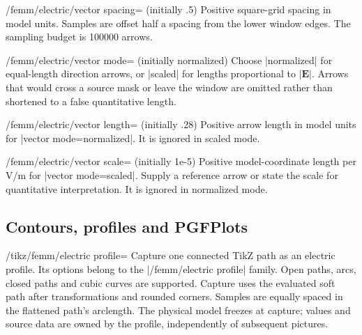 \begin{key}{/femm/electric/vector spacing= (initially .5)}
Positive square-grid spacing in model units. Samples are offset half a spacing
from the lower window edges. The sampling budget is 100000 arrows.
\end{key}

\begin{key}{/femm/electric/vector mode= (initially normalized)}
Choose |normalized| for equal-length direction arrows, or |scaled| for lengths
proportional to $|\mathbf E|$. Arrows that would cross a source mask or leave
the window are omitted rather than shortened to a false quantitative length.
\end{key}

\begin{key}{/femm/electric/vector length= (initially .28)}
Positive arrow length in model units for |vector mode=normalized|.
It is ignored in scaled mode.
\end{key}

\begin{key}{/femm/electric/vector scale= (initially 1e-5)}
Positive model-coordinate length per V/m for |vector mode=scaled|.
Supply a reference arrow or state the scale for quantitative interpretation.
It is ignored in normalized mode.
\end{key}

\begin{codeexample}[width=0pt]
\end{codeexample}

\subsection{Contours, profiles and PGFPlots}
\label{sec:electric-profile}
\begin{key}{/tikz/femm/electric profile=}
Capture one connected TikZ path as an electric profile.
Its options belong to the |/femm/electric profile| family. Open paths, arcs, closed paths and cubic curves are
supported. Capture uses the evaluated soft path after transformations and
rounded corners. Samples are equally spaced in the flattened path's arclength.
The physical model freezes at capture; values and source data are owned by the
profile, independently of subsequent pictures.
\end{key}

